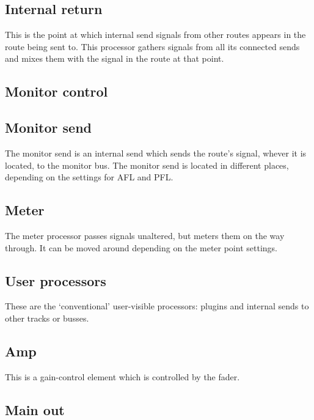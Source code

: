 \documentclass[10pt,a4paper]{book}
\begin{document}
{%

\subsection{Internal return}

This is the point at which internal send signals from other routes
appears in the route being sent to.  This processor gathers signals
from all its connected sends and mixes them with the signal in the
route at that point.

\subsection{Monitor control}


\subsection{Monitor send}

The monitor send is an internal send which sends the route's signal,
whever it is located, to the monitor bus.  The monitor send is located
in different places, depending on the settings for AFL and PFL\@.

\subsection{Meter}

The meter processor passes signals unaltered, but meters them on the
way through.  It can be moved around depending on the meter point settings.

\subsection{User processors}

These are the `conventional' user-visible processors: plugins and
internal sends to other tracks or busses.

\subsection{Amp}

This is a gain-control element which is controlled by the fader.

\subsection{Main out}

}
\end{document}
